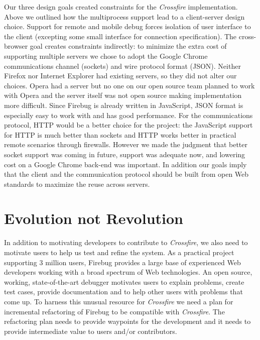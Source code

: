 Our three design goals created constraints for the \textit{Crossfire}
implementation. Above we outlined how the multiprocess support lead to a
client-server design choice. Support for remote and mobile debug forces
isolation of user interface to the client (excepting some small interface for
connection specification). The cross-browser goal creates constraints
indirectly: to minimize the extra cost of supporting multiple servers we chose
to adopt the Google Chrome communications channel (sockets) and wire protocol
format (JSON). Neither Firefox nor Internet Explorer had existing servers, so
they did not alter our choices. Opera had a server but no one on our open source
team planned to work with Opera and the server itself was not open source making
implementation more difficult.  Since Firebug is already written in JavaScript,
JSON format is especially easy to work with and has good performance\cite{json}.
 For the communications protocol, HTTP would be a better choice for the project:
the JavaScript support for HTTP is much better than sockets and HTTP works
better in practical remote scenarios through firewalls.  However we made the
judgment that better socket support was coming in future\cite{websocketapi},
support was adequate now, and lowering cost on a Google Chrome back-end was
important.  In addition our goals imply that the client and the communication
protocol should be built from open Web standards to maximize the reuse across
servers.

\section{Evolution not Revolution}
In addition to motivating developers to contribute to \textit{Crossfire}, we
also need to motivate users to help us test and refine the system. As a
practical project supporting 3 million users, Firebug provides a large base of
experienced Web developers working with a broad spectrum of Web technologies. An
open source, working, state-of-the-art debugger motivates users to explain
problems, create test cases, provide documentation and to help other users with
problems that come up. To harness this
 unusual resource  for \textit{Crossfire} we need a plan for incremental
 refactoring of Firebug to be compatible
with \textit{Crossfire}.  The refactoring plan needs to provide waypoints for
the development and it needs to provide intermediate value to users and/or
contributors.


